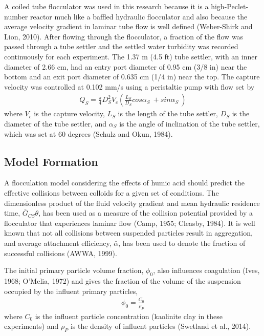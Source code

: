 \documentclass[letterpaper,10pt,english]{sphinxmanual}
\begin{document}
A coiled tube flocculator was used in this research because it is a high-Peclet-number reactor much like a baffled hydraulic flocculator and also because the average velocity gradient in laminar tube flow is well defined (Weber-Shirk and Lion, 2010). After flowing through the flocculator, a fraction of the flow was passed through a tube settler and the settled water turbidity was recorded continuously for each experiment. The 1.37 m (4.5 ft) tube settler, with an inner diameter of 2.66 cm, had an entry port diameter of 0.95 cm (3/8 in) near the bottom and an exit port diameter of 0.635 cm (1/4 in) near the top. The capture velocity was controlled at 0.102 mm/s using a peristaltic pump with flow set by
\begin{equation}\label{equation:Flocculation/Floc_Model:Flocculation/Floc_Model:14}
\begin{split}Q_S=\frac{\pi}{4} D^2_{S}V_{c}\left(\frac{L_{S}}{D_{S}}{cos {\alpha }_{S}\ }+{sin {\alpha }_{S}\ }\right)\end{split}
\end{equation}
where \(V_{c}\) is the capture velocity, \(L_{S}\) is the length of the tube settler, \(D_{S}\) is the diameter of the tube settler, and \({\alpha }_{S}\) is the angle of inclination of the tube settler, which was set at 60 degrees (Schulz and Okun, 1984).


\subsection{Model Formation}
\label{\detokenize{Flocculation/Floc_Model:model-formation}}
A flocculation model considering the effects of humic acid should predict the effective collisions between colloids for a given set of conditions. The dimensionless product of the fluid velocity gradient and mean hydraulic residence time, \(\bar G_{CS}\theta\), has been used as a measure of the collision potential provided by a flocculator that experiences laminar flow (Camp, 1955; Cleasby, 1984). It is well known that not all collisions between suspended particles result in aggregation, and average attachment efficiency, \(\bar{\alpha }\), has been used to denote the fraction of successful collisions (AWWA, 1999).

The initial primary particle volume fraction, \({\phi }_0\), also influences coagulation (Ives, 1968; O’Melia, 1972) and gives the fraction of the volume of the suspension occupied by the influent primary particles,
\begin{equation}\label{equation:Flocculation/Floc_Model:Flocculation/Floc_Model:15}
\begin{split}{\phi }_0=\frac{C_0}{{\rho }_{P}}\end{split}
\end{equation}
where \(C_0\) is the influent particle concentration (kaolinite clay in these experiments) and \({\rho }_{P}\) is the density of influent particles (Swetland et al., 2014).
\end{document}
